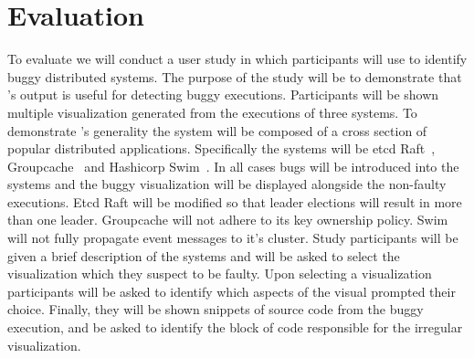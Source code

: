 \section{Evaluation}
\label{sec:evaluation}

To evaluate \dviz we will conduct a user study in which participants will use
\dviz to identify buggy distributed systems. The purpose of the study will be
to demonstrate that \dviz's output is useful for detecting buggy executions.
Participants will be shown multiple visualization generated from the executions
of three systems. To demonstrate \dviz's generality the system will be composed
of a cross section of popular distributed applications. Specifically the
systems will be etcd Raft~\cite{etcdraft}, Groupcache~\cite{groupcache} and
Hashicorp Swim~\cite{das2002swim}.  In all cases bugs will be introduced into the
systems and the buggy visualization will be displayed alongside the non-faulty
executions. Etcd Raft will be modified so that leader elections will result in
more than one leader.  Groupcache will not adhere to its key ownership policy.
Swim will not fully propagate event messages to it's cluster. Study participants
will be given a brief description of the systems and will be asked to select the
visualization which they suspect to be faulty. Upon selecting a visualization
participants will be asked to identify which aspects of the visual prompted
their choice.  Finally, they will be shown snippets of source code from the
buggy execution, and be asked to identify the block of code responsible for the
irregular visualization.


